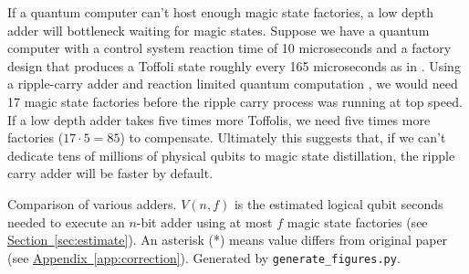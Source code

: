 \documentclass[onecolumn,unpublished]{quantumarticle}
\theoremstyle{definition}
\theoremstyle{definition}
\theoremstyle{definition}
\renewcommand{\sec}[1]{\hyperref[sec:#1]{Section~\ref*{sec:#1}}}
\DeclareRobustCommand{\app}[1]{\hyperref[app:#1]{Appendix~\ref*{app:#1}}}
\begin{document}
If a quantum computer can't host enough magic state factories, a low depth adder will bottleneck waiting for magic states.
Suppose we have a quantum computer with a control system reaction time of 10 microseconds and a factory design that produces a Toffoli state roughly every 165 microseconds as in \cite{gidney2019autoccz}.
Using a ripple-carry adder and reaction limited quantum computation \cite{fowler2012timeoptimal,gidney2019autoccz}, we would need 17 magic state factories before the ripple carry process was running at top speed.
If a low depth adder takes five times more Toffolis, we need five times more factories ($17 \cdot 5 = 85$) to compensate.
Ultimately this suggests that, if we can't dedicate tens of millions of physical qubits to magic state distillation, the ripple carry adder will be faster by default.

\begin{table}
\centering
\resizebox{\linewidth}{!}{

}
    \caption{Comparison of various adders.
    $V(n,f)$ is the estimated logical qubit seconds needed to execute an $n$-bit adder using at most $f$ magic state factories (see \sec{estimate}).
    An asterisk (*) means value differs from original paper (see \app{correction}).
    Generated by \texttt{generate\_figures.py}.
    }
    \label{tbl:comparison}
\end{table}
\end{document}
